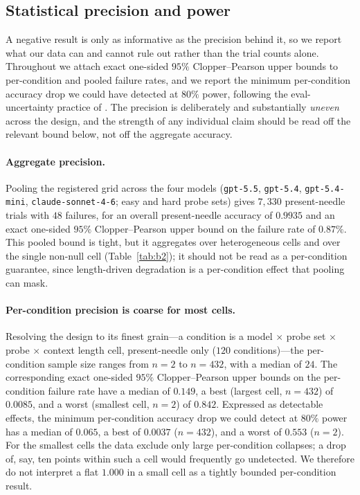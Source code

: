 \subsection{Statistical precision and power}
\label{sec:results:precision}

A negative result is only as informative as the precision behind it, so we
report what our data can and cannot rule out rather than the trial counts
alone. Throughout we attach exact one-sided $95\%$ Clopper--Pearson upper
bounds to per-condition and pooled failure rates, and we report the minimum
per-condition accuracy drop we could have detected at $80\%$ power, following
the eval-uncertainty practice of \citet{miller2024errorbars}. The precision is
deliberately and substantially \emph{uneven} across the design, and the
strength of any individual claim should be read off the relevant bound below,
not off the aggregate accuracy.

\paragraph{Aggregate precision.} Pooling the registered grid across the four
models (\texttt{gpt-5.5}, \texttt{gpt-5.4}, \texttt{gpt-5.4-mini},
\texttt{claude-sonnet-4-6}; easy and hard probe sets) gives $7{,}330$
present-needle trials with $48$ failures, for an overall present-needle
accuracy of $0.9935$ and an exact one-sided $95\%$ Clopper--Pearson upper bound
on the failure rate of $0.87\%$. This pooled bound is tight, but it aggregates
over heterogeneous cells and over the single non-null cell
(Table~\ref{tab:b2}); it should not be read as a per-condition guarantee, since
length-driven degradation is a per-condition effect that pooling can mask.

\paragraph{Per-condition precision is coarse for most cells.} Resolving the
design to its finest grain---a condition is a model $\times$ probe set $\times$
probe $\times$ context length cell, present-needle only ($120$ conditions)---the
per-condition sample size ranges from $n=2$ to $n=432$, with a median of $24$.
The corresponding exact one-sided $95\%$ Clopper--Pearson upper bounds on the
per-condition failure rate have a median of $0.149$, a best (largest cell,
$n=432$) of $0.0085$, and a worst (smallest cell, $n=2$) of $0.842$. Expressed
as detectable effects, the minimum per-condition accuracy drop we could detect
at $80\%$ power has a median of $0.065$, a best of $0.0037$ ($n=432$), and a
worst of $0.553$ ($n=2$). For the smallest cells the data exclude only large
per-condition collapses; a drop of, say, ten points within such a cell would
frequently go undetected. We therefore do not interpret a flat $1.000$ in a
small cell as a tightly bounded per-condition result.

